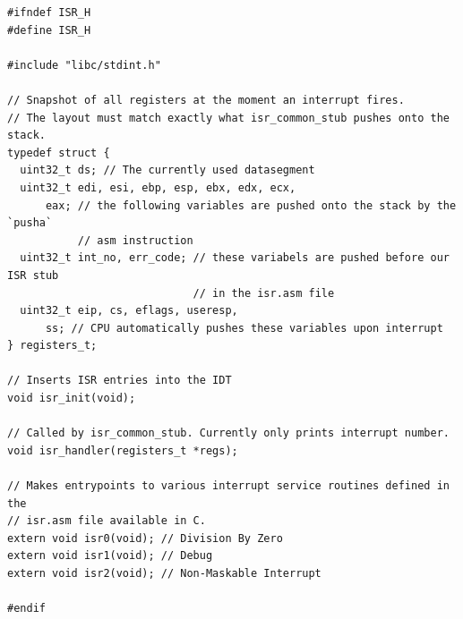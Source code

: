 \documentclass[../main.tex]{subfiles}
\begin{document}
\begin{listing}[H]
    \begin{verbatim}
#ifndef ISR_H
#define ISR_H

#include "libc/stdint.h"

// Snapshot of all registers at the moment an interrupt fires.
// The layout must match exactly what isr_common_stub pushes onto the stack.
typedef struct {
  uint32_t ds; // The currently used datasegment
  uint32_t edi, esi, ebp, esp, ebx, edx, ecx,
      eax; // the following variables are pushed onto the stack by the `pusha`
           // asm instruction
  uint32_t int_no, err_code; // these variabels are pushed before our ISR stub
                             // in the isr.asm file
  uint32_t eip, cs, eflags, useresp,
      ss; // CPU automatically pushes these variables upon interrupt
} registers_t;

// Inserts ISR entries into the IDT
void isr_init(void);

// Called by isr_common_stub. Currently only prints interrupt number.
void isr_handler(registers_t *regs);

// Makes entrypoints to various interrupt service routines defined in the
// isr.asm file available in C.
extern void isr0(void); // Division By Zero
extern void isr1(void); // Debug
extern void isr2(void); // Non-Maskable Interrupt

#endif
    \end{verbatim}
    \caption{Implementation of \texttt{isr.h}}
    \label{lst:isr_h}
\end{listing}
\end{document}
